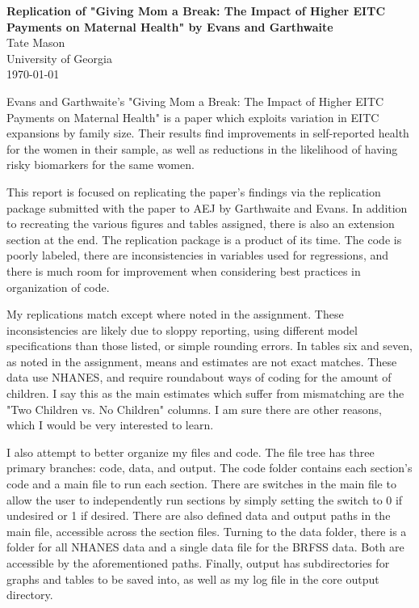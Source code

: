 \documentclass[11pt]{article}
\newcommand{\Title}{Replication of "Giving Mom a Break: The Impact of Higher EITC Payments on Maternal Health" by Evans and Garthwaite}
\newcommand{\Author}{Tate Mason}
\newcommand{\Date}{\today}
\newcommand{\1}[1]{\mathbb{I}\{#1\}}
\theoremstyle{plain}
\begin{document}
\begin{center}
  {\large \textbf{\Title}}\\[0.5em]
  {\large \Author}\\
  University of Georgia\\[0.25em]
  {\Date}
\end{center}

Evans and Garthwaite's "Giving Mom a Break: The Impact of Higher EITC Payments on Maternal Health" is a paper which exploits variation
in EITC expansions by family size. Their results find improvements in self-reported health for the women in their sample, as well as 
reductions in the likelihood of having risky biomarkers for the same women.

This report is focused on replicating the paper's findings via the replication package submitted with the paper to AEJ by Garthwaite and Evans. In addition to
recreating the various figures and tables assigned, there is also an extension section at the end. The replication package is a product
of its time. The code is poorly labeled, there are inconsistencies in variables used for regressions, and there is much room for improvement 
when considering best practices in organization of code.

My replications match except where noted in the assignment. These inconsistencies are likely due to sloppy reporting, using different model 
specifications than those listed, or simple rounding errors. In tables six and seven, as noted in the assignment, means and estimates are not
exact matches. These data use NHANES, and require roundabout ways of coding for the amount of children. I say this as the main estimates which
suffer from mismatching are the "Two Children vs. No Children" columns. I am sure there are other reasons, which I would be very interested to learn.

I also attempt to better organize my files and code. The file tree has three primary branches:
code, data, and output. The code folder contains each section's code and a main file to run each section. There are switches in the main file to allow the user
to independently run sections by simply setting the switch to 0 if undesired or 1 if desired. There are also defined data and output paths in the main file, accessible
across the section files. Turning to the data folder, there is a folder for all NHANES data and a single data file for the BRFSS data. Both are accessible by the
aforementioned paths. Finally, output has subdirectories for graphs and tables to be saved into, as well as my log file in the core output directory.
\end{document}
